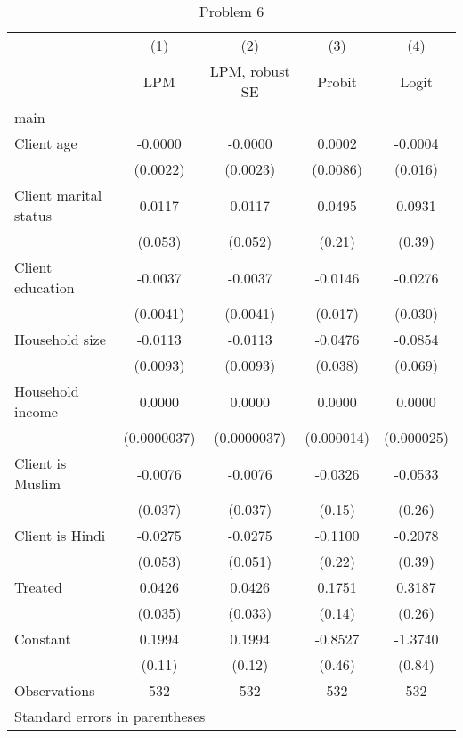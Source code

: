 \begin{table}[htbp]\centering
\caption{Problem 6\label{q6}}
\begin{tabular}{l*{4}{c}}
\toprule
                    &\multicolumn{1}{c}{(1)}&\multicolumn{1}{c}{(2)}&\multicolumn{1}{c}{(3)}&\multicolumn{1}{c}{(4)}\\
                    &\multicolumn{1}{c}{LPM}&\multicolumn{1}{c}{LPM, robust SE}&\multicolumn{1}{c}{Probit}&\multicolumn{1}{c}{Logit}\\
\midrule
main                &            &            &            &            \\
Client age          &     -0.0000&     -0.0000&      0.0002&     -0.0004\\
                    &    (0.0022)&    (0.0023)&    (0.0086)&     (0.016)\\
\addlinespace
Client marital status&      0.0117&      0.0117&      0.0495&      0.0931\\
                    &     (0.053)&     (0.052)&      (0.21)&      (0.39)\\
\addlinespace
Client education    &     -0.0037&     -0.0037&     -0.0146&     -0.0276\\
                    &    (0.0041)&    (0.0041)&     (0.017)&     (0.030)\\
\addlinespace
Household size      &     -0.0113&     -0.0113&     -0.0476&     -0.0854\\
                    &    (0.0093)&    (0.0093)&     (0.038)&     (0.069)\\
\addlinespace
Household income    &      0.0000&      0.0000&      0.0000&      0.0000\\
                    & (0.0000037)& (0.0000037)&  (0.000014)&  (0.000025)\\
\addlinespace
Client is Muslim    &     -0.0076&     -0.0076&     -0.0326&     -0.0533\\
                    &     (0.037)&     (0.037)&      (0.15)&      (0.26)\\
\addlinespace
Client is Hindi     &     -0.0275&     -0.0275&     -0.1100&     -0.2078\\
                    &     (0.053)&     (0.051)&      (0.22)&      (0.39)\\
\addlinespace
Treated             &      0.0426&      0.0426&      0.1751&      0.3187\\
                    &     (0.035)&     (0.033)&      (0.14)&      (0.26)\\
\addlinespace
Constant            &      0.1994&      0.1994&     -0.8527&     -1.3740\\
                    &      (0.11)&      (0.12)&      (0.46)&      (0.84)\\
\midrule
Observations        &         532&         532&         532&         532\\
\bottomrule
\multicolumn{5}{l}{\footnotesize Standard errors in parentheses}\\
\end{tabular}
\end{table}
